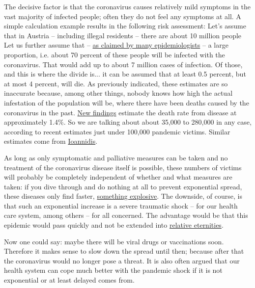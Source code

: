 \documentclass[%
 reprint,
 showpacs,
 showkeys,
 preprintnumbers,
 amsmath,amssymb,
 aps,
  pra,
  longbibliography,
 floatfix,
 ]{revtex4-1}
\begin{document}
The decisive factor is that the coronavirus causes relatively mild symptoms in the vast majority of infected people; often they do not feel any symptoms at all.
A simple calculation example results in the following risk assessment:
Let's assume that in Austria -- including illegal residents -- there are about 10 million people
Let us further assume that --
\href{https://www.theatlantic.com/health/archive/2020/02/covid-vaccine/607000/}{as claimed by many epidemiologists}
-- a large proportion, i.e. about 70 percent of these people will be infected with the coronavirus.
That would add up to about 7 million cases of infection.
Of those, and this is where the divide is...
it can be assumed that at least 0.5 percent, but at most 4 percent, will die.
As previously indicated, these estimates are so inaccurate because, among other things, nobody knows how high the actual infestation of the population will be,
where there have been deaths caused by the coronavirus in the past.
\href{https://doi.org/10.1038/s41591-020-0822-7}{New findings} estimate the death rate from disease at approximately 1.4\%.
So we are talking about about 35,000 to 280,000 in any case, according to recent estimates just under 100,000 pandemic victims.
Similar estimates come from
\href{https://doi.org/10.1111/eci.13222}{Ioannidis}.

As long as only symptomatic and palliative measures can be taken and no treatment of the coronavirus disease itself is possible,
these numbers of victims will probably be completely independent of whether and what measures are taken: if you dive through and do nothing at all
to prevent exponential spread, these diseases only find faster,
\href{https://topdocumentaryfilms.com/arithmetic-population-and-energy-lecture/}{something explosive}.
The downside, of course, is that such an exponential increase is a severe traumatic shock -- for our health care system, among others --
for all concerned.
The advantage would be that this epidemic would pass quickly and not be extended into \href{https://medium.com/@joschabach/flattening-the-curve-is-a-deadly-delusion-eea324fe9727}{relative eternities}.

Now one could say: maybe there will be viral drugs or vaccinations soon. Therefore it makes sense to slow down the spread until then; because after that
the coronavirus would no longer pose a threat.
It is also often argued that our health system can cope much better with the pandemic shock if it is not exponential or at least delayed
comes from.
\end{document}
